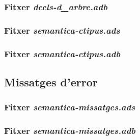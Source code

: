 
\subsubsection{Fitxer \emph{decls-d\_arbre.adb}}

\newpage

\subsubsection{Fitxer \emph{semantica-ctipus.ads}}

\newpage

\subsubsection{Fitxer \emph{semantica-ctipus.adb}}

\newpage

\subsection{Missatges d'error}
\subsubsection{Fitxer \emph{semantica-missatges.ads}}

\newpage

\subsubsection{Fitxer \emph{semantica-missatges.adb}}

\newpage
